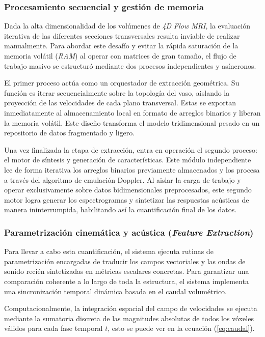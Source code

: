 \subsubsection{Procesamiento secuencial y gestión de memoria}

Dada la alta dimensionalidad de los volúmenes de \textit{4D Flow MRI}, la evaluación iterativa de las diferentes secciones transversales resulta inviable de realizar manualmente. Para abordar este desafío y evitar la rápida saturación de la memoria volátil (\textit{RAM}) al operar con matrices de gran tamaño, el flujo de trabajo masivo se estructuró mediante dos procesos independientes y asíncronos.

El primer proceso actúa como un orquestador de extracción geométrica. Su función es iterar secuencialmente sobre la topología del vaso, aislando la proyección de las velocidades de cada plano transversal. Estas se exportan inmediatamente al almacenamiento local en formato de arreglos binarios y liberan la memoria volátil. Este diseño transforma el modelo tridimensional pesado en un repositorio de datos fragmentado y ligero.

Una vez finalizada la etapa de extracción, entra en operación el segundo proceso: el motor de síntesis y generación de características. Este módulo independiente lee de forma iterativa los arreglos binarios previamente almacenados y los procesa a través del algoritmo de emulación Doppler. Al aislar la carga de trabajo y operar exclusivamente sobre datos bidimensionales preprocesados, este segundo motor logra generar los espectrogramas y sintetizar las respuestas acústicas de manera ininterrumpida, habilitando así la cuantificación final de los datos.

\subsubsection{Parametrización cinemática y acústica (\textit{Feature Extraction})}

Para llevar a cabo esta cuantificación, el sistema ejecuta rutinas de parametrización encargadas de traducir los campos vectoriales y las ondas de sonido recién sintetizadas en métricas escalares concretas. Para garantizar una comparación coherente a lo largo de toda la estructura, el sistema implementa una sincronización temporal dinámica basada en el caudal volumétrico.

Computacionalmente, la integración espacial del campo de velocidades se ejecuta mediante la sumatoria discreta de las magnitudes absolutas de todos los vóxeles válidos para cada fase temporal $t$, esto se puede ver en la ecuación (\ref{eq:caudal}).

